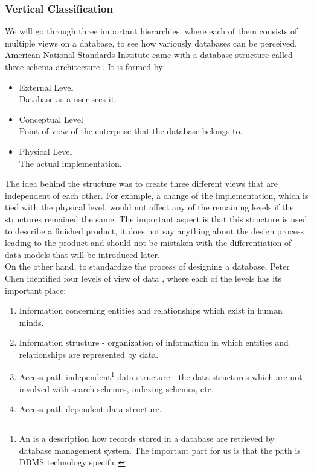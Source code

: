 \subsubsection{Vertical Classification}

We will go through three important hierarchies, where each of them consists of multiple views on a database, to see how variously databases can be perceived.\\

American National Standards Institute came with a database structure called three-schema architecture \cite{ANSIArchitecture75}. It is formed by:
\begin{itemize}
	\item External Level \\ Database as a user sees it. 
	\item Conceptual Level \\ Point of view of the enterprise that the database belongs to.
	\item Physical Level \\ The actual implementation.
\end{itemize}

The idea behind the structure was to create three different views that are independent of each other. 
For example, a change of the implementation, which is tied with the physical level, would not affect any of the remaining levels if the structures remained the same. 
The important aspect is that this structure is used to describe a finished product, it does not say anything about the design process leading to the product and should not be mistaken with the differentiation of data models that will be introduced later.\\

On the other hand, to standardize the process of designing a database, Peter Chen identified four levels of view of data \cite{Chen76theentity-relationship}, where each of the levels has its important place: \\
\begin{enumerate}
	\item Information concerning entities and relationships which exist in human minds.
	\item Information structure - organization of information in which entities and relationships are represented by data.
	\item Access-path-independent\footnote{An  is a description how records stored in a database are retrieved by database management system\cite{AccessPathDefiniton}. The important part for us is that the path is DBMS technology specific.} data structure - the data structures which are not involved with search schemes, indexing schemes, etc.
	\item Access-path-dependent data structure.
\end{enumerate}

